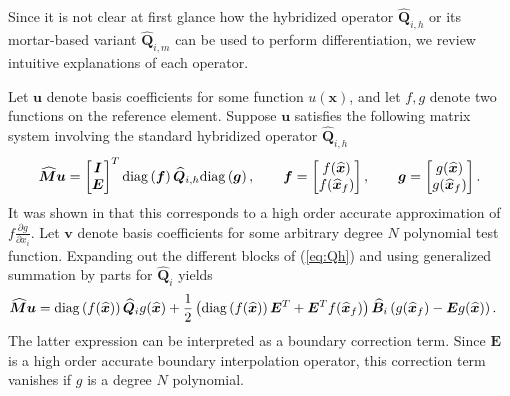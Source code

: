\documentclass{svjour3}                     %
\renewcommand{\hat}{\widehat}
\newcommand{\diag}[1]{{\rm diag}\LRp{#1}}
\newcommand{\pd}[2]{\frac{\partial#1}{\partial#2}}
\newcommand{\LRp}[1]{\left( #1 \right)}
\begin{document}
Since it is not clear at first glance how the hybridized operator $\hat{\bm{Q}}_{i,h}$ or its mortar-based variant $\hat{\bm{Q}}_{i,m}$ can be used to perform differentiation, we review intuitive explanations of each operator.  

Let $\bm{u}$ denote basis coefficients for some function $u(\bm{x})$, and let $f, g$ denote two functions on the reference element.  Suppose $\bm{u}$ satisfies the following matrix system involving the standard hybridized operator $\hat{\bm{Q}}_{i,h}$
\begin{align}
\hat{\bm{M}}\bm{u} = \begin{bmatrix}
\bm{I}\\
\bm{E}
\end{bmatrix}^T \diag{\bm{f}}\hat{\bm{Q}}_{i,h} \diag{\bm{g}}, \qquad \bm{f} = \begin{bmatrix} f(\hat{\bm{x}}) \\ f(\hat{\bm{x}}_f)\end{bmatrix}, \qquad \bm{g} = \begin{bmatrix} g(\hat{\bm{x}}) \\ g(\hat{\bm{x}}_f)\end{bmatrix}.
\label{eq:Qh}
\end{align}
It was shown in \cite{chan2017discretely, chan2019skew} that this corresponds to a high order accurate approximation of $f\pd{g}{x_i}$.  Let $\bm{v}$ denote basis coefficients for some arbitrary degree $N$ polynomial test function.  Expanding out the different blocks of (\ref{eq:Qh}) and using generalized summation by parts for $\hat{\bm{Q}}_i$ yields
\begin{align*}
\hat{\bm{M}}\bm{u} &= 
\diag{f(\hat{\bm{x}})}\hat{\bm{Q}}_i g(\hat{\bm{x}}) + \frac{1}{2}\LRp{\diag{f(\hat{\bm{x}})}\bm{E}^T + \bm{E}^T f(\hat{\bm{x}}_f)}\hat{\bm{B}}_i \LRp{g(\hat{\bm{x}}_f) - \bm{E} g(\hat{\bm{x}})}.
\end{align*}
The latter expression can be interpreted as a boundary correction term.  Since $\bm{E}$ is a high order accurate boundary interpolation operator, this correction term vanishes if $g$ is a degree $N$ polynomial.  
\end{document}
